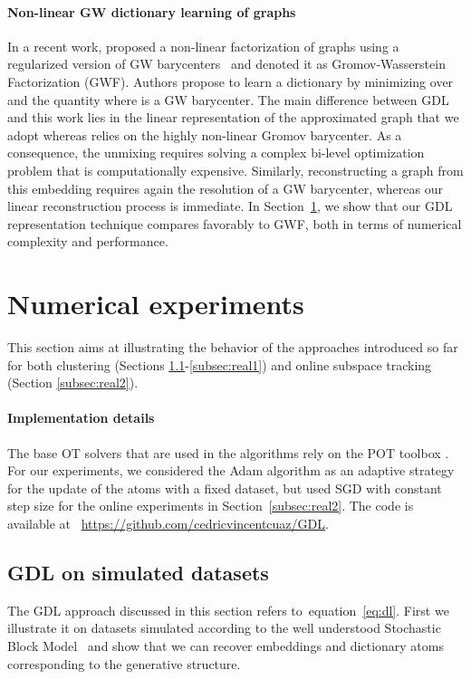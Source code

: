 \documentclass{article}
\def\eqref#1{equation~\ref{#1}}
\begin{document}
	\paragraph{Non-linear GW dictionary learning of graphs} 
	In a recent work,
	\citep{xu_gromov-wasserstein_2019} proposed a non-linear factorization of
	graphs using a regularized version of GW barycenters~\citep{peyre2016gromov} and
	denoted it as Gromov-Wasserstein Factorization (GWF). Authors propose to learn a dictionary  by 
	minimizing over  and  the
	quantity  where  is a GW barycenter. The main difference between GDL and this
	work lies in the linear representation of the approximated graph that we adopt whereas
	\citep{xu_gromov-wasserstein_2019} relies on the highly non-linear Gromov
	barycenter. As a consequence, the unmixing requires solving a complex
	bi-level optimization problem that is computationally expensive. Similarly,
	reconstructing a graph from this embedding requires again the resolution of a
	GW barycenter, whereas our linear reconstruction process is immediate. 
	In Section~\ref{sec:exp}, we show that our GDL
	representation technique compares favorably to GWF, both in terms of numerical complexity and
	performance.
	
	\section{Numerical experiments}\label{sec:exp}
	This section aims at illustrating the behavior of the approaches introduced so far for both clustering (Sections \ref{subsec:simu}-\ref{subsec:real1})  and online subspace tracking (Section \ref{subsec:real2}).
	
	
	\paragraph{Implementation details} The base OT solvers that are used in the
	algorithms rely on the POT toolbox \citep{flamary2017pot}.
	For our experiments, we considered the Adam algorithm \citep{kingma2014adam} as
	an adaptive strategy for the update of the atoms with a fixed dataset, but used
	SGD with constant step size for the online experiments in Section~\ref{subsec:real2}. The code is available at ~\href{https://github.com/cedricvincentcuaz/GDL}{https://github.com/cedricvincentcuaz/GDL}.
	
	\subsection{GDL on simulated datasets}\label{subsec:simu}
	The GDL approach discussed in this section refers to~\eqref{eq:dl}.
	First we illustrate it on datasets simulated according to the well understood Stochastic Block Model~\citep[SBM,][]{holland1983stochastic,wang1987stochastic} and show that we can recover embeddings and dictionary atoms corresponding to the generative structure.
	
\end{document}
